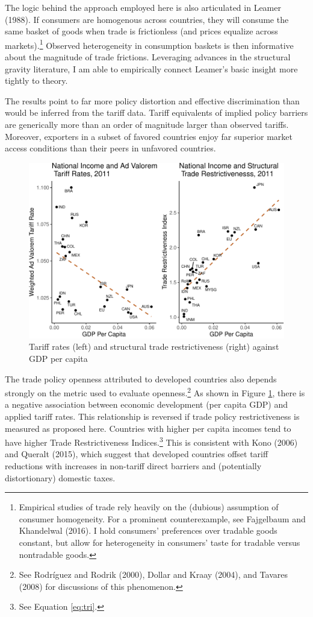 \documentclass{puthesis}
\begin{document}
The logic behind the approach employed here is also articulated in
Leamer (1988). If consumers are homogenous across countries, they will
consume the same basket of goods when trade is frictionless (and prices
equalize across markets).\footnote{Empirical studies of trade rely
  heavily on the (dubious) assumption of consumer homogeneity. For a
  prominent counterexample, see Fajgelbaum and Khandelwal (2016). I hold
  consumers' preferences over tradable goods constant, but allow for
  heterogeneity in consumers' taste for tradable versus nontradable
  goods.} Observed heterogeneity in consumption baskets is then
informative about the magnitude of trade frictions. Leveraging advances
in the structural gravity literature, I am able to empirically connect
Leamer's basic insight more tightly to theory.

The results point to far more policy distortion and effective
discrimination than would be inferred from the tariff data. Tariff
equivalents of implied policy barriers are generically more than an
order of magnitude larger than observed tariffs. Moreover, exporters in
a subset of favored countries enjoy far superior market access
conditions than their peers in unfavored countries.

\begin{figure}
\centering
\includegraphics{figure/triIncome-1.pdf}
\caption{Tariff rates (left) and structural trade restrictiveness
(right) against GDP per capita \label{fig:triIncome}}
\end{figure}

The trade policy openness attributed to developed countries also depends
strongly on the metric used to evaluate openness.\footnote{See Rodríguez
  and Rodrik (2000), Dollar and Kraay (2004), and Tavares (2008) for
  discussions of this phenomenon.} As shown in Figure
\ref{fig:triIncome}, there is a negative association between economic
development (per capita GDP) and applied tariff rates. This relationship
is reversed if trade policy restrictiveness is measured as proposed
here. Countries with higher per capita incomes tend to have higher Trade
Restrictiveness Indices.\footnote{See Equation \ref{eq:tri}.} This is
consistent with Kono (2006) and Queralt (2015), which suggest that
developed countries offset tariff reductions with increases in
non-tariff direct barriers and (potentially distortionary) domestic
taxes.
\end{document}
